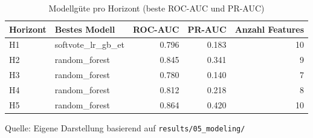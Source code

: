 \begin{table}[H]
  \centering
  \caption{Modellgüte pro Horizont (beste ROC-AUC und PR-AUC)}
  \label{tab:phase05_modeling_summary}
  \begin{tabular}{l l r r r}
    \toprule
    Horizont & Bestes Modell & ROC-AUC & PR-AUC & Anzahl Features \\
    \midrule
    H1 & softvote\_lr\_gb\_et & 0.796 & 0.183 & 10 \\
    H2 & random\_forest & 0.845 & 0.341 & 9 \\
    H3 & random\_forest & 0.780 & 0.140 & 7 \\
    H4 & random\_forest & 0.812 & 0.218 & 8 \\
    H5 & random\_forest & 0.864 & 0.420 & 10 \\
    \bottomrule
  \end{tabular}
  \par\smallskip
  {\footnotesize Quelle: Eigene Darstellung basierend auf \texttt{results/05\_modeling/}}
\end{table}

